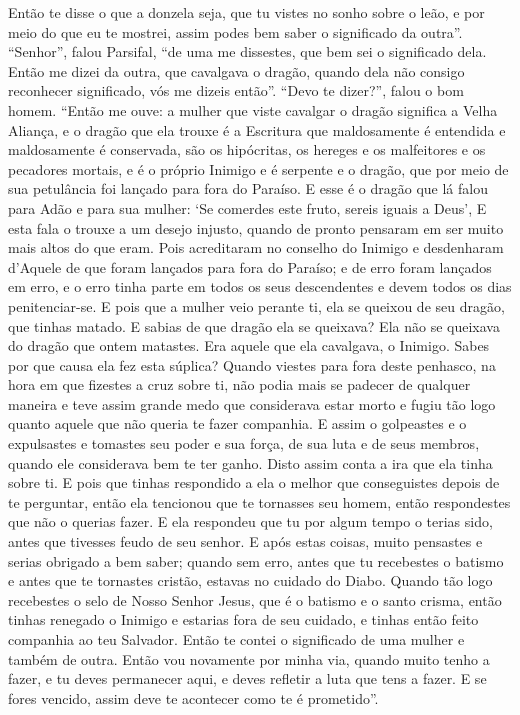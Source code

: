 Então te disse o que a donzela seja, que tu vistes no sonho sobre o leão, e
por meio do que eu te mostrei, assim podes bem saber o significado da outra”. 
“Senhor”, falou Parsifal, “de uma me dissestes, que bem sei
o significado dela. Então me dizei da outra, que cavalgava o dragão, quando
dela não consigo reconhecer significado, vós me dizeis então”. “Devo te
dizer?”, falou o bom homem. “Então me ouve: a mulher que viste cavalgar o
dragão significa a Velha Aliança, e o dragão que ela trouxe é a Escritura que
maldosamente é entendida e maldosamente é conservada, são os hipócritas, os
hereges e os malfeitores e os pecadores mortais, e é o próprio Inimigo e é
serpente e o dragão, que por meio de sua petulância foi lançado para fora do
Paraíso. E esse é o dragão que lá falou para Adão e para sua mulher: ‘Se
comerdes este fruto, sereis iguais a Deus’, E esta fala o trouxe a um desejo
injusto, quando de pronto pensaram em ser muito mais altos do que eram. Pois
acreditaram no conselho do Inimigo e desdenharam d’Aquele de que foram lançados
para fora do Paraíso; e de erro foram lançados em erro, e o erro tinha parte em
todos os seus descendentes e devem todos os dias penitenciar-se. E pois que a
mulher veio perante ti, ela se queixou de seu dragão, que tinhas matado. E
sabias de que dragão ela se queixava? Ela não se queixava do dragão que ontem
matastes. Era aquele que ela cavalgava, o Inimigo. Sabes por que causa ela fez
esta súplica? Quando viestes para fora deste penhasco, na hora em que fizestes
a cruz sobre ti, não podia mais se padecer de qualquer maneira e teve assim
grande medo que considerava estar morto e fugiu tão logo quanto aquele que não
queria te fazer companhia. E assim o golpeastes e o expulsastes e tomastes seu
poder e sua força, de sua luta e de seus membros, quando ele considerava bem te
ter ganho. Disto assim conta a ira que ela tinha sobre ti. E pois que tinhas
respondido a ela o melhor que conseguistes depois de te perguntar, então ela
tencionou que te tornasses seu homem, então respondestes que não o querias
fazer. E ela respondeu que tu por algum tempo o terias sido, antes que tivesses
feudo de seu senhor. E após estas coisas, muito pensastes e serias obrigado a
bem saber; quando sem erro, antes que tu recebestes o batismo e antes que te
tornastes cristão, estavas no cuidado do Diabo. Quando tão logo recebestes o
selo de Nosso Senhor Jesus, que é o batismo e o santo crisma, então tinhas
renegado o Inimigo e estarias fora de seu cuidado, e tinhas então feito
companhia ao teu Salvador. Então te contei o significado de uma mulher e também
de outra. Então vou novamente por minha via, quando muito tenho a fazer, e tu
deves permanecer aqui, e deves refletir a luta que tens a fazer. E se fores
vencido, assim deve te acontecer como te é prometido”. 

